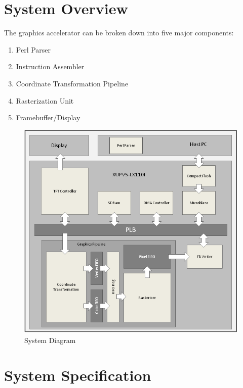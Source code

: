 \documentclass[letterpaper,10pt]{article}
\begin{document}
\section{System Overview}
The graphics accelerator can be broken down into five major components:
\begin{enumerate}

\item Perl Parser

\item Instruction Assembler

\item Coordinate Transformation Pipeline

\item Rasterization Unit

\item Framebuffer/Display

\end{enumerate}
\begin{figure}[h!]
\begin{center}
\includegraphics[scale=.70]{system.png}
\end{center}
\caption{System Diagram}
\label{fig:system}
\end{figure}

\section{System Specification}
\end{document}
